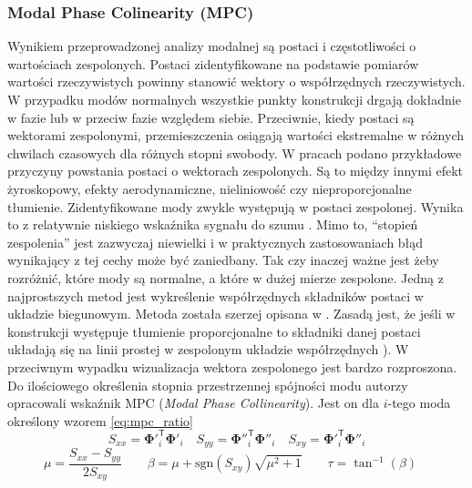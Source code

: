 \subsubsection{Modal Phase Colinearity (MPC)}
Wynikiem przeprowadzonej analizy modalnej są postaci i częstotliwości o wartościach zespolonych. Postaci zidentyfikowane na podstawie pomiarów wartości rzeczywistych powinny stanowić wektory o współrzędnych rzeczywistych. W przypadku modów normalnych wszystkie punkty konstrukcji drgają dokładnie w fazie lub w przeciw fazie względem siebie. Przeciwnie, kiedy postaci są wektorami zespolonymi, przemieszczenia osiągają wartości ekstremalne w różnych chwilach czasowych dla różnych stopni swobody. W pracach \cite{Ewins2000,Chopra2012a} podano przykładowe przyczyny powstania postaci o wektorach zespolonych. Są to między innymi efekt żyroskopowy, efekty aerodynamiczne, nieliniowość czy nieproporcjonalne tłumienie. Zidentyfikowane mody zwykle występują w postaci zespolonej. Wynika to z relatywnie niskiego wskaźnika sygnału do szumu \parencite{Rainieri2014}. Mimo to, \enquote{stopień zespolenia} jest zazwyczaj niewielki i w praktycznych zastosowaniach błąd wynikający z tej cechy może być zaniedbany. Tak czy inaczej ważne jest żeby rozróżnić, które mody są normalne, a które w dużej mierze zespolone. Jedną z najprostszych metod jest wykreślenie współrzędnych składników postaci w układzie biegunowym. Metoda została szerzej opisana w \parencite{Ewins2000}. Zasadą jest, że jeśli w konstrukcji występuje tłumienie proporcjonalne to składniki danej postaci układają się na linii prostej w zespolonym układzie współrzędnych \parencite{Rainieri2014}). W przeciwnym wypadku wizualizacja wektora zespolonego jest bardzo rozproszona.
Do ilościowego określenia stopnia przestrzennej spójności modu autorzy \cite{Pappa1992} opracowali wskaźnik MPC (\textit{Modal Phase Collinearity}). Jest on dla $i$-tego moda określony wzorem \ref{eq:mpc_ratio}
\begin{equation}
	{S}_{xx}={\mathbf{\Phi}'}_{i}^{\mathsf{T}} {\mathbf{\Phi}} '_{i} \quad
	{S}_{yy}={\mathbf{\Phi}''}_{i}^{\mathsf{T}} {\mathbf{\Phi}}''_{i} \quad
	{S}_{xy}={\mathbf{\Phi}'}_{i}^{\mathsf{T}} {\mathbf{\Phi}}''_{i}
\end{equation}
\begin{equation}
	{\mu}=\frac{S_{xx}-S_{yy}}{2S_{xy}} \quad \quad
	\beta=\mu+\mathrm{sgn}(S_{xy})\sqrt{\mu^{2}+1} \quad \quad
	\tau=\tan^{-1}{(\beta)} \quad
\end{equation}
